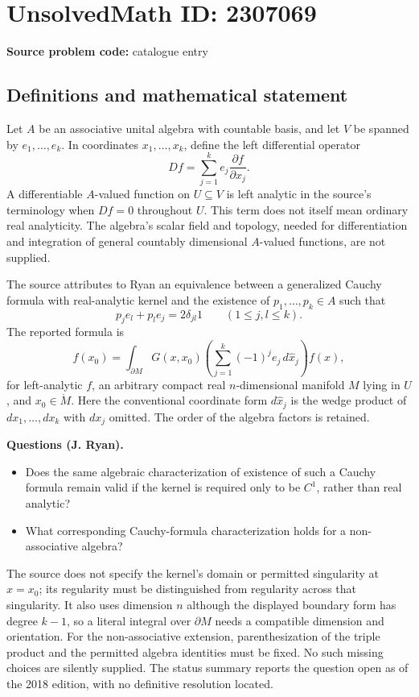 \documentclass[11pt]{article}
\begin{document}
\section*{UnsolvedMath ID: 2307069}
\textbf{Source problem code:} catalogue entry
\subsection{Definitions and mathematical statement}
Let $A$ be an associative unital algebra with countable basis, and let $V$ be spanned by $e_1,\ldots,e_k$. In coordinates $x_1,\ldots,x_k$, define the left differential operator
\[
Df=\sum_{j=1}^{k}e_j\frac{\partial f}{\partial x_j}.
\]
A differentiable $A$-valued function on $U\subseteq V$ is left analytic in the source's terminology when $Df=0$ throughout $U$. This term does not itself mean ordinary real analyticity. The algebra's scalar field and topology, needed for differentiation and integration of general countably dimensional $A$-valued functions, are not supplied.

The source attributes to Ryan an equivalence between a generalized Cauchy formula with real-analytic kernel and the existence of $p_1,\ldots,p_k\in A$ such that
\[
p_je_l+p_le_j=2\delta_{jl}1\qquad(1\leq j,l\leq k).
\]
The reported formula is
\[
f(x_0)=\int_{\partial M}G(x,x_0)
\left(\sum_{j=1}^{k}(-1)^je_j\,d\widehat x_j\right)f(x),
\]
for left-analytic $f$, an arbitrary compact real $n$-dimensional manifold $M$ lying in $U$, and $x_0\in\mathring M$. Here the conventional coordinate form $d\widehat x_j$ is the wedge product of $dx_1,\ldots,dx_k$ with $dx_j$ omitted. The order of the algebra factors is retained.

\textbf{Questions (J. Ryan).}
\begin{itemize}
\item Does the same algebraic characterization of existence of such a Cauchy formula remain valid if the kernel is required only to be $C^1$, rather than real analytic?
\item What corresponding Cauchy-formula characterization holds for a non-associative algebra?
\end{itemize}
The source does not specify the kernel's domain or permitted singularity at $x=x_0$; its regularity must be distinguished from regularity across that singularity. It also uses dimension $n$ although the displayed boundary form has degree $k-1$, so a literal integral over $\partial M$ needs a compatible dimension and orientation. For the non-associative extension, parenthesization of the triple product and the permitted algebra identities must be fixed. No such missing choices are silently supplied. The status summary reports the question open as of the 2018 edition, with no definitive resolution located.
\end{document}

